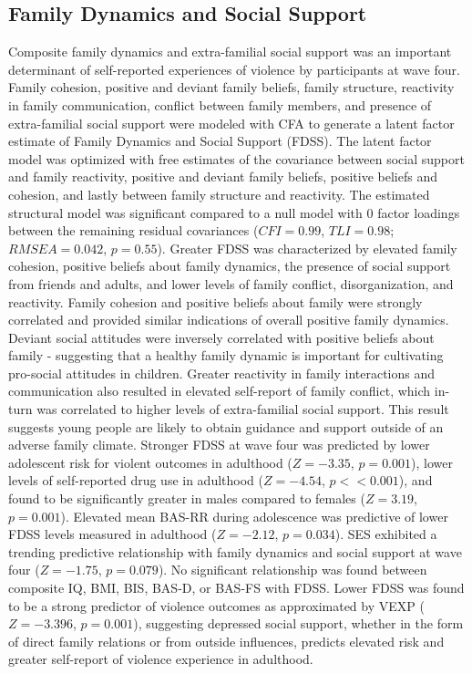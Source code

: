 \documentclass[utf8]{article}
\begin{document}
\subsection{Family Dynamics and Social Support} Composite family dynamics and extra-familial social support was an important determinant of self-reported experiences of violence by participants at wave four. Family cohesion, positive and deviant family beliefs, family structure, reactivity in family communication, conflict between family members, and presence of extra-familial social support were modeled with CFA to generate a latent factor estimate of Family Dynamics and Social Support (FDSS). The latent factor model was optimized with free estimates of the covariance between social support and family reactivity, positive and deviant family beliefs, positive beliefs and cohesion, and lastly between family structure and reactivity. The estimated structural model was significant compared to a null model with $0$ factor loadings between the remaining residual covariances ($CFI=0.99$, $TLI=0.98$; $RMSEA=0.042$, $p=0.55$). Greater FDSS was characterized by elevated family cohesion, positive beliefs about family dynamics, the presence of social support from friends and adults, and lower levels of family conflict, disorganization, and reactivity. Family cohesion and positive beliefs about family were strongly correlated and provided similar indications of overall positive family dynamics. Deviant social attitudes were inversely correlated with positive beliefs about family  - suggesting that a healthy family dynamic is important for cultivating pro-social attitudes in children. Greater reactivity in family interactions and communication also resulted in elevated self-report of family conflict, which in-turn was correlated to higher levels of extra-familial social support. This result suggests young people are likely to obtain guidance and support outside of an adverse family climate. Stronger FDSS at wave four was predicted by lower adolescent risk for violent outcomes in adulthood ($Z=-3.35$, $p=0.001$), lower levels of self-reported drug use in adulthood ($Z=-4.54$, $p<<0.001$), and found to be significantly greater in males compared to females ($Z=3.19$, $p=0.001$).  Elevated mean BAS-RR during adolescence was predictive of lower FDSS levels measured in adulthood ($Z=-2.12$, $p=0.034$). SES exhibited a trending predictive relationship with family dynamics and social support at wave four ($Z=-1.75$, $p=0.079$). No significant relationship was found between composite IQ, BMI, BIS, BAS-D, or BAS-FS with FDSS. Lower FDSS was found to be a strong predictor of violence outcomes as approximated by VEXP ($Z=-3.396$, $p=0.001$), suggesting depressed social support, whether in the form of direct family relations or from outside influences, predicts elevated risk and greater self-report of violence experience in adulthood.
\end{document}
